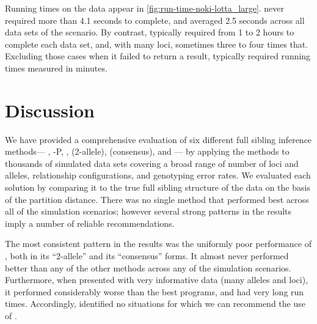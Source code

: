 \documentclass[11pt]{article}
\begin{document}
{Running times on the \lottalarge{} data appear in \ref{fig:run-time-noki-lotta_large}.  \familyfinder{} 
never required more than 4.1 seconds to complete, and averaged 2.5 seconds across all data sets of the 
\lottalarge{} scenario.  By contrast, \colony{} typically required from 1 to 2 hours to complete each 
data set, and, with many loci, sometimes three to four times that. Excluding those cases when it failed 
to return a result, \prt{} typically required running times measured in minutes.

\section{Discussion}
We have provided a comprehensive evaluation of six different full sibling inference methods---
\colony{}, \colony-P, \familyfinder{}, \kinalyzer{} (2-allele), \kinalyzer{} (consensus), and \prt{}---
by applying the methods to thousands of simulated data sets covering a broad range of number of loci 
and alleles, relationship configurations, and genotyping error rates.  We evaluated each solution by 
comparing it to the true full sibling structure of the data on the basis of the partition distance.  
There was no single method that performed best across all of the simulation scenarios; however several 
strong patterns in the results imply a number of reliable recommendations.

The most consistent pattern in the results was the uniformly poor performance of \kinalyzer{}, both in 
its ``2-allele'' and its ``consensus'' forms.  It almost never performed better than any of the other 
methods across any of the simulation scenarios.  Furthermore, when presented with very informative data 
(many alleles and loci), it performed considerably worse than the best programs, and had very long run 
times.  Accordingly, identified no situations for which we can recommend the use of \kinalyzer{}.

}
\end{document}
